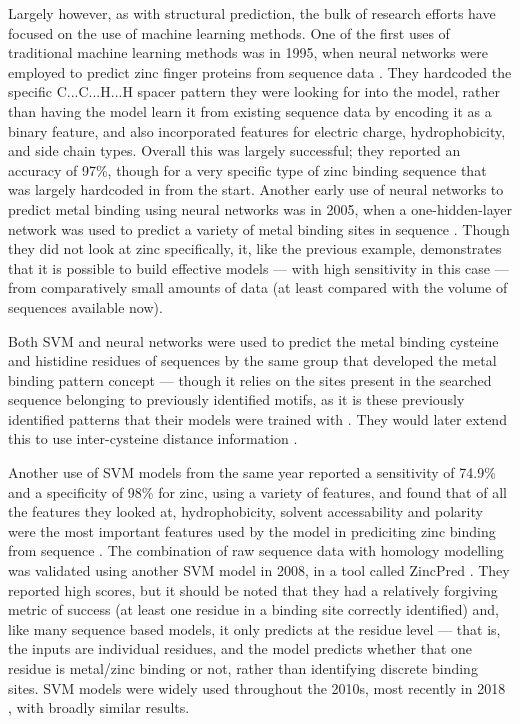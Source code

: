 Largely however, as with structural prediction, the bulk of research efforts have focused on the use of machine learning methods. One of the first uses of traditional machine learning methods was in 1995, when neural networks were employed to predict zinc finger proteins from sequence data \cite{nakata1995prediction}. They hardcoded the specific C...C...H...H spacer pattern they were looking for into the model, rather than having the model learn it from existing sequence data by encoding it as a binary feature, and also incorporated features for electric charge, hydrophobicity, and side chain types. Overall this was largely successful; they reported an accuracy of 97\%, though for a very specific type of zinc binding sequence that was largely hardcoded in from the start. Another early use of neural networks to predict metal binding using neural networks was in 2005, when a one-hidden-layer network was used to predict a variety of metal binding sites in sequence \cite{lin2005protein}. Though they did not look at zinc specifically, it, like the previous example, demonstrates that it is possible to build effective models --- with high sensitivity in this case --- from comparatively small amounts of data (at least compared with the volume of sequences available now).

Both SVM and neural networks were used to predict the metal binding cysteine and histidine residues of sequences by the same group that developed the metal binding pattern concept --- though it relies on the sites present in the searched sequence belonging to previously identified motifs, as it is these previously identified patterns that their models were trained with \cite{passerini2006identifying}. They would later extend this to use inter-cysteine distance information \cite{passerini2007predicting}.

Another use of SVM models from the same year reported a sensitivity of 74.9\% and a specificity of 98\% for zinc, using a variety of features, and found that of all the features they looked at, hydrophobicity, solvent accessability and polarity were the most important features used by the model in prediciting zinc binding from sequence \cite{lin2006prediction}. The combination of raw sequence data with homology modelling was validated using another SVM model in 2008, in a tool called ZincPred \cite{shu2008prediction}. They reported high scores, but it should be noted that they had a relatively forgiving metric of success (at least one residue in a binding site correctly identified) and, like many sequence based models, it only predicts at the residue level --- that is, the inputs are individual residues, and the model predicts whether that one residue is metal/zinc binding or not, rather than identifying discrete binding sites. SVM models were widely used throughout the 2010s, most recently in 2018 \cite{srivastava2018prediction}, with broadly similar results.

